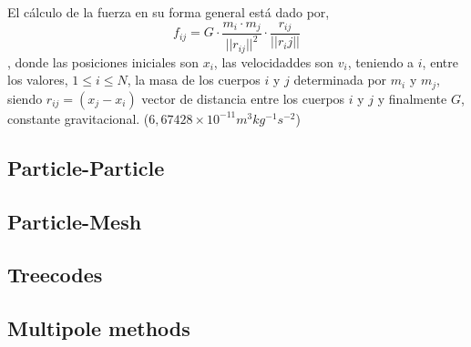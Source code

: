 


El cálculo de la fuerza en su forma general está dado por,
$$f_{ij} =G \cdot \frac{m_i \cdot m_j}{||r_{ij}||^{2}} \cdot \frac{r_{ij}}{||r_ij||}$$,
donde las posiciones iniciales son $x_i$,
las velocidaddes son $v_i$,
teniendo a $i$, entre los valores, $1 \leq i \leq N$,
la masa de los cuerpos $i$ y $j$ determinada por $m_i$ y $m_j$,
siendo $r_{ij} = (x_j - x_i )$ vector de distancia entre los cuerpos $i$ y $j$
y finalmente $G$, constante gravitacional. ($6,67428 \times 10^{-11} m^{3} kg^{-1} s^{-2}$)


\subsection{Particle-Particle}

\subsection{Particle-Mesh}

\subsection{Treecodes}

\subsection{Multipole methods}


